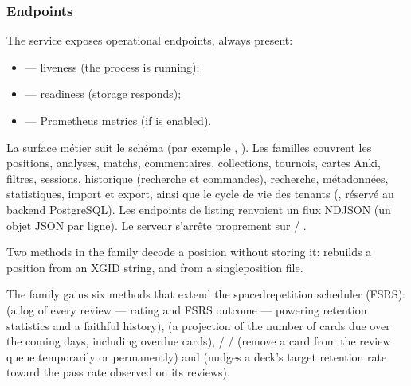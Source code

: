 \documentclass[letterpaper,10pt,english]{sphinxmanual}
\begin{document}
\subsubsection{Endpoints}
\label{\detokenize{mode_headless:points-d-acces}}
\sphinxAtStartPar
The service exposes operational endpoints, always present:
\begin{itemize}
\item {} 
\sphinxAtStartPar
{} — liveness (the process is running);

\item {} 
\sphinxAtStartPar
{} — readiness (storage responds);

\item {} 
\sphinxAtStartPar
{} — Prometheus metrics (if  is enabled).

\end{itemize}

\sphinxAtStartPar
La surface métier suit le schéma  (par exemple
, ). Les familles couvrent les
positions, analyses, matchs, commentaires, collections, tournois, cartes Anki,
filtres, sessions, historique (recherche et commandes), recherche,
métadonnées, statistiques, import et export, ainsi que le cycle de vie des
tenants (, réservé au backend PostgreSQL). Les endpoints de
listing renvoient un flux NDJSON (un objet JSON par ligne). Le serveur
s’arrête proprement sur  / .

\sphinxAtStartPar
Two methods in the  family decode a position without storing it:  rebuilds a position from an XGID string, and  from a single\sphinxhyphen{}position  file.

\sphinxAtStartPar
The  family gains six methods that extend the spaced\sphinxhyphen{}repetition scheduler (FSRS):  (a log of every review — rating and FSRS outcome — powering retention statistics and a faithful history),  (a projection of the number of cards due over the coming days, including overdue cards),  /  /  (remove a card from the review queue temporarily or permanently) and  (nudges a deck’s target retention rate toward the pass rate observed on its reviews).
\end{document}
